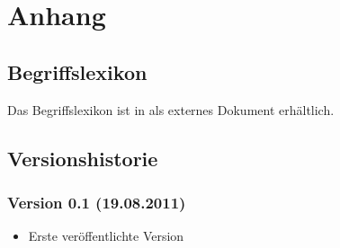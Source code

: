 \documentclass[a4paper,10pt,titlepage]{article}
\begin{document}
\clearpage
\appendix
\section{Anhang}

\subsection{Begriffslexikon}

Das Begriffslexikon ist in als externes Dokument erhältlich.

\clearpage
\subsection{Versionshistorie}

	\subsubsection*{Version 0.1 (19.08.2011)}
	\begin{itemize}
		\item Erste veröffentlichte Version
	\end{itemize}
\end{document}
